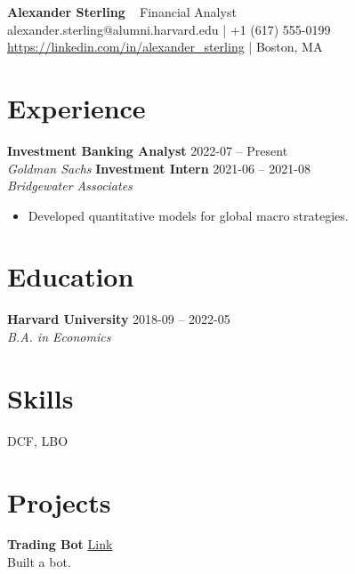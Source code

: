 \documentclass[a4paper,10pt]{article}
\begin{document}
\begin{center}
    {\Huge \textbf{Alexander Sterling}} \
    \vspace{2mm}
    Financial Analyst \\
    alexander.sterling@alumni.harvard.edu | +1 (617) 555-0199 \\
    \href{https://linkedin.com/in/alexander\_sterling}{https://linkedin.com/in/alexander\_sterling} | Boston, MA
\end{center}

\section*{Experience}
\noindent \textbf{Investment Banking Analyst} \hfill 2022-07 -- Present \\
\textit{Goldman Sachs}
\vspace{2mm}
\noindent \textbf{Investment Intern} \hfill 2021-06 -- 2021-08 \\
\textit{Bridgewater Associates}
\begin{itemize}[noitemsep,topsep=0pt]
        \item Developed quantitative models for global macro strategies.
    \end{itemize}
\vspace{2mm}

\section*{Education}
\noindent \textbf{Harvard University} \hfill 2018-09 -- 2022-05 \\
\textit{B.A. in Economics}
\vspace{2mm}

\section*{Skills}
\begin{description}[style=multiline,leftmargin=3cm,font=\bfseries]
        \item[Finance] DCF, LBO
        \item[EmptySkills] 
    \end{description}

\section*{Projects}
\noindent \textbf{Trading Bot} \hfill \href{https://github.com/asterling/bot}{Link} \\
Built a bot.
\vspace{2mm}
\end{document}
